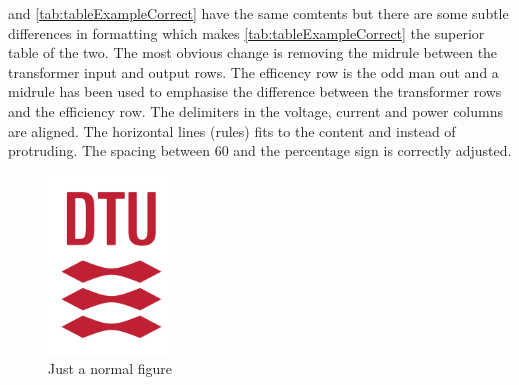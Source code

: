  and \cref{tab:tableExampleCorrect} have the same comtents but there are some subtle differences in formatting which makes \cref{tab:tableExampleCorrect} the superior table of the two. The most obvious change is removing the midrule between the transformer input and output rows. The efficency row is the odd man out and a midrule has been used to emphasise the difference between the transformer rows and the efficiency row. The delimiters in the voltage, current and power columns are aligned. The horizontal lines (rules) fits to the content and instead of protruding. The spacing between 60 and the percentage sign is correctly adjusted.

\begin{figure}[H]
\centering
\includegraphics[width=0.3\textwidth]{Pictures/Logos/dtured_cmyk.pdf}
\caption{Just a normal figure}
\label{fig:figure}
\end{figure}

